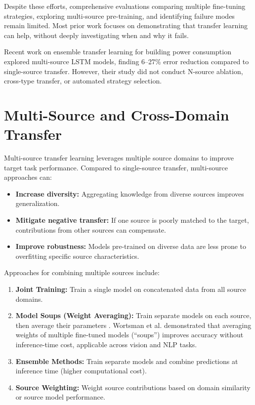 \documentclass[12pt,a4paper]{report}
\begin{document}
Despite these efforts, comprehensive evaluations comparing multiple fine-tuning strategies, exploring multi-source pre-training, and identifying failure modes remain limited. Most prior work focuses on demonstrating that transfer learning can help, without deeply investigating when and why it fails.

Recent work on ensemble transfer learning for building power consumption \cite{ensembletransfer2023} explored multi-source LSTM models, finding 6--27\% error reduction compared to single-source transfer. However, their study did not conduct N-source ablation, cross-type transfer, or automated strategy selection.

\section{Multi-Source and Cross-Domain Transfer}

Multi-source transfer learning leverages multiple source domains to improve target task performance. Compared to single-source transfer, multi-source approaches can:

\begin{itemize}
    \item \textbf{Increase diversity:} Aggregating knowledge from diverse sources improves generalization.
    \item \textbf{Mitigate negative transfer:} If one source is poorly matched to the target, contributions from other sources can compensate.
    \item \textbf{Improve robustness:} Models pre-trained on diverse data are less prone to overfitting specific source characteristics.
\end{itemize}

Approaches for combining multiple sources include:

\begin{enumerate}
    \item \textbf{Joint Training:} Train a single model on concatenated data from all source domains.
    \item \textbf{Model Soups (Weight Averaging):} Train separate models on each source, then average their parameters \cite{wortsman2022model}. Wortsman et al. demonstrated that averaging weights of multiple fine-tuned models (``soups'') improves accuracy without inference-time cost, applicable across vision and NLP tasks.
    \item \textbf{Ensemble Methods:} Train separate models and combine predictions at inference time (higher computational cost).
    \item \textbf{Source Weighting:} Weight source contributions based on domain similarity or source model performance.
\end{enumerate}
\end{document}
